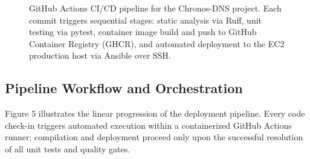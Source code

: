 \documentclass[10pt,journal,compsoc]{IEEEtran}
\begin{document}
\begin{figure}[!t]
\centering
{}
\caption{GitHub Actions CI/CD pipeline for the Chronos-DNS project. Each commit triggers sequential stages: static analysis via Ruff, unit testing via pytest, container image build and push to GitHub Container Registry (GHCR), and automated deployment to the EC2 production host via Ansible over SSH.}
\end{figure}

\subsection{Pipeline Workflow and Orchestration}
Figure 5 illustrates the linear progression of the deployment pipeline. Every code check-in triggers automated execution within a containerized GitHub Actions runner; compilation and deployment proceed only upon the successful resolution of all unit tests and quality gates.
\end{document}
